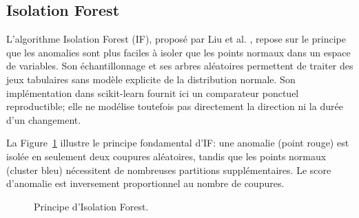 \subsection{Isolation Forest}
L'algorithme Isolation Forest (IF), proposé par Liu et al. \citep{liu2008isolation}, repose
sur le principe que les anomalies sont plus faciles à isoler que les points normaux dans un
espace de variables. Son échantillonnage et ses arbres aléatoires permettent de traiter des
jeux tabulaires sans modèle explicite de la distribution normale. Son implémentation dans
scikit-learn \citep{sklearn_api} fournit ici un comparateur ponctuel reproductible; elle ne
modélise toutefois pas directement la direction ni la durée d'un changement.

La Figure~\ref{fig:if_principle} illustre le principe fondamental d'IF: une anomalie
(point rouge) est isolée en seulement deux coupures aléatoires, tandis que les points
normaux (cluster bleu) nécessitent de nombreuses partitions supplémentaires. Le score
d'anomalie est inversement proportionnel au nombre de coupures.

\begin{figure}[H]
    \centering
    \caption{Principe d'Isolation Forest.}
    \label{fig:if_principle}
\end{figure}

